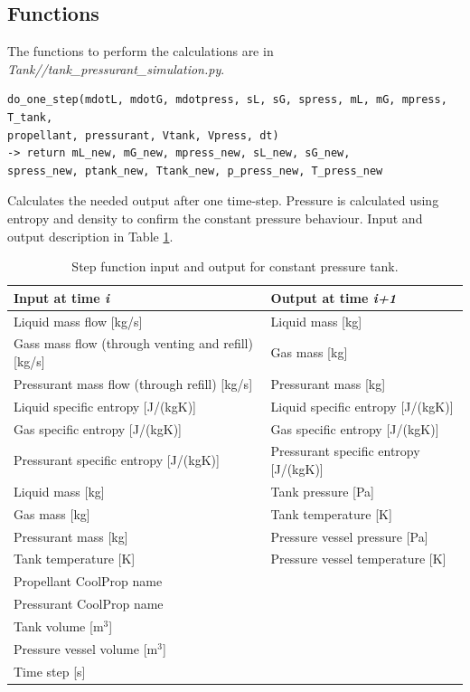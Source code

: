 \subsection{Functions}
The functions to perform the calculations are in \textit{Tank//tank\_pressurant\_simulation.py}.\\
\begin{verbatim}
do_one_step(mdotL, mdotG, mdotpress, sL, sG, spress, mL, mG, mpress, T_tank, 
propellant, pressurant, Vtank, Vpress, dt)
-> return mL_new, mG_new, mpress_new, sL_new, sG_new,
spress_new, ptank_new, Ttank_new, p_press_new, T_press_new
\end{verbatim}
\hspace*{2em} Calculates the needed output after one time-step. Pressure is calculated using entropy and density to confirm the constant pressure behaviour. Input and output description in Table \ref{Tab: StepPressurised}.
\begin{table}[h!]
\centering
\begin{tabular}{l|l}
\hline
\textbf{Input at time \textit{i}} & \textbf{Output at time \textit{i+1}}\\
\hline
Liquid mass flow [kg/s] & Liquid mass [kg] \\
Gass mass flow (through venting and refill) [kg/s] & Gas mass [kg] \\
Pressurant mass flow (through refill) [kg/s] & Pressurant mass [kg] \\
Liquid specific entropy [J/(kgK)] & Liquid specific entropy [J/(kgK)]\\
Gas specific entropy [J/(kgK)] & Gas specific entropy [J/(kgK)]\\
Pressurant specific entropy [J/(kgK)] & Pressurant specific entropy [J/(kgK)]\\
Liquid mass [kg] & Tank pressure [Pa]\\
Gas mass [kg] & Tank temperature [K]\\
Pressurant mass [kg] & Pressure vessel pressure [Pa]\\
Tank temperature [K] & Pressure vessel temperature [K]\\
Propellant CoolProp name & \\
Pressurant CoolProp name & \\
Tank volume [m$^3$] & \\
Pressure vessel volume [m$^3$] & \\
Time step [s] & \\
\hline
\end{tabular}
\caption{Step function input and output for constant pressure tank.}
\label{Tab: StepPressurised}
\end{table}
